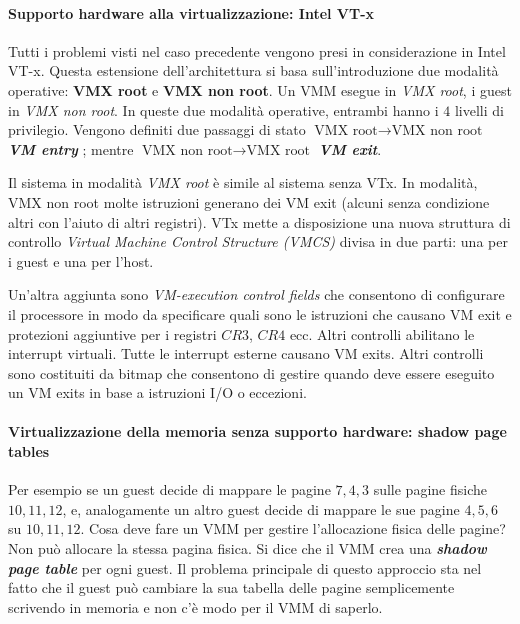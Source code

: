 \documentclass{article}
\begin{document}
\paragraph{Supporto hardware alla virtualizzazione: Intel VT-x}
Tutti i problemi visti nel caso precedente vengono presi in considerazione in Intel VT-x. Questa estensione dell'architettura si basa sull'introduzione due modalità operative: \textbf{VMX root} e \textbf{VMX non root}. Un VMM esegue in \textit{VMX root}, i guest in \textit{VMX non root}. In queste due modalità operative, entrambi hanno i $4$ livelli di privilegio. Vengono definiti due passaggi di stato $\text{VMX root} \to \text{VMX non root}$ \textbf{\textit{VM entry}} ; mentre $\text{VMX non root} \to \text{VMX root}$ \textbf{\textit{VM exit}}.

Il sistema in modalità \textit{VMX root} è simile al sistema senza VTx. In modalità, VMX non root molte istruzioni generano dei VM exit (alcuni senza condizione altri con l'aiuto di altri registri). VTx mette a disposizione una nuova struttura di controllo \textit{Virtual Machine Control Structure (VMCS)} divisa in due parti: una per i guest e una per l'host.

Un'altra aggiunta sono \textit{VM-execution control fields} che consentono di configurare il processore in modo da specificare quali sono le istruzioni che causano VM exit e protezioni aggiuntive per i registri $CR3$, $CR4$ ecc. Altri controlli abilitano le interrupt virtuali. Tutte le interrupt esterne causano VM exits. Altri controlli sono costituiti da bitmap che consentono di gestire quando deve essere eseguito un VM exits in base a istruzioni I/O o eccezioni.

\paragraph{Virtualizzazione della memoria senza supporto hardware: shadow page tables}
Per esempio se un guest decide di mappare le pagine $7,4,3$ sulle pagine fisiche $10,11,12$, e, analogamente un altro guest decide di mappare le sue pagine $4,5,6$ su $10,11,12$. Cosa deve fare un VMM per gestire l'allocazione fisica delle pagine? Non può allocare la stessa pagina fisica. Si dice che il VMM crea una \textbf{\textit{shadow page table}} per ogni guest. Il problema principale di questo approccio sta nel fatto che il guest può cambiare la sua tabella delle pagine semplicemente scrivendo in memoria e non c'è modo per il VMM di saperlo.
\end{document}
